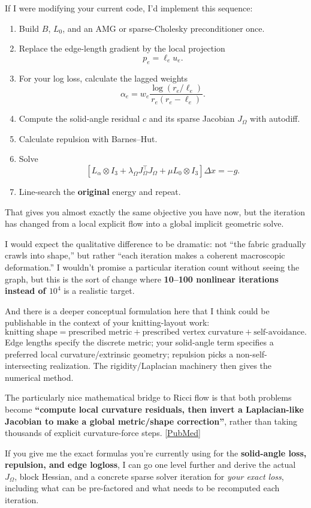 \documentclass[11pt]{article}
\begin{document}
If I were modifying your current code, I'd implement this sequence:
\begin{enumerate}
  \item Build \(B\), \(L_0\), and an AMG or sparse-Cholesky preconditioner
        once.
  \item Replace the edge-length gradient by the local projection
        \[
        p_e=\ell_eu_e.
        \]
  \item For your log loss, calculate the lagged weights
        \[
        \alpha_e=
        w_e
        \frac{\log(r_e/\ell_e)}
        {r_e(r_e-\ell_e)}.
        \]
  \item Compute the solid-angle residual \(c\) and its sparse Jacobian
        \(J_\Omega\) with autodiff.
  \item Calculate repulsion with Barnes--Hut.
  \item Solve
        \[
        \left[
        L_\alpha\otimes I_3+
        \lambda_\Omega J_\Omega^\top J_\Omega+
        \mu L_0\otimes I_3
        \right]\Delta x=-g.
        \]
  \item Line-search the \textbf{original} energy and repeat.
\end{enumerate}
That gives you almost exactly the same objective you have now, but the
iteration has changed from a local explicit flow into a global implicit
geometric solve.

I would expect the qualitative difference to be dramatic: not ``the fabric
gradually crawls into shape,'' but rather ``each iteration makes a coherent
macroscopic deformation.'' I wouldn't promise a particular iteration count
without seeing the graph, but this is the sort of change where
\textbf{10--100 nonlinear iterations instead of \(10^4\)} is a realistic
target.

And there is a deeper conceptual formulation here that I think could be
publishable in the context of your knitting-layout work:
\[
\boxed{
\text{knitting shape}
=
\text{prescribed metric}
+
\text{prescribed vertex curvature}
+
\text{self-avoidance}.
}
\]
Edge lengths specify the discrete metric; your solid-angle term specifies a
preferred local curvature/extrinsic geometry; repulsion picks a
non-self-intersecting realization. The rigidity/Laplacian machinery then
gives the numerical method.

The particularly nice mathematical bridge to Ricci flow is that both
problems become \textbf{``compute local curvature residuals, then invert a
Laplacian-like Jacobian to make a global metric/shape correction''}, rather
than taking thousands of explicit curvature-force steps.
\href{https://pubmed.ncbi.nlm.nih.gov/18599915/?utm_source=chatgpt.com}{[PubMed]}

If you give me the exact formulas you're currently using for the
\textbf{solid-angle loss, repulsion, and edge logloss}, I can go one level
further and derive the actual \(J_\Omega\), block Hessian, and a concrete
sparse solver iteration for \emph{your exact loss}, including what can be
pre-factored and what needs to be recomputed each iteration.
\end{document}
